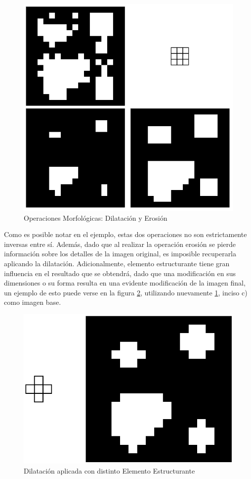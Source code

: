 \begin{figure}[H]
\centering
\includegraphics[scale=0.53]{Figures/ErosDil_NoGrid.png}
    \caption{Operaciones Morfológicas: Dilatación y Erosión}
    \label{fig:Ero+Dil}
\end{figure}

Como es posible notar en el ejemplo, estas dos operaciones no son estrictamente inversas entre sí. Además, dado que al realizar la operación erosión se pierde información sobre los detalles de la imagen original, es imposible recuperarla aplicando la dilatación. Adicionalmente, elemento estructurante tiene gran influencia en el resultado que se obtendrá, dado que una modificación en sus dimensiones o su forma resulta en una evidente modificación de la imagen final, un ejemplo de esto puede verse en la figura \ref{fig:Dil_ES2}, utilizando nuevamente  \ref{fig:Ero+Dil}, inciso c) como imagen base.

\begin{figure}[H]
\centering
\includegraphics[scale=0.25]{Figures/Dil_ES2.png}
    \caption{Dilatación aplicada con distinto Elemento Estructurante}
    \label{fig:Dil_ES2}
\end{figure}

